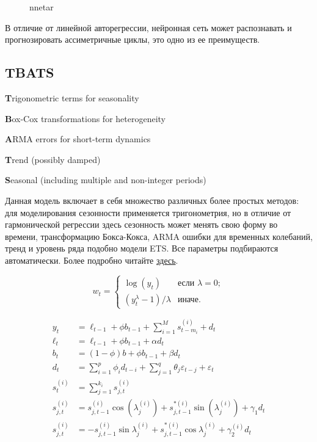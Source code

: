 \documentclass[a4paper,12pt]{article}
\theoremstyle{plain} %
\theoremstyle{definition} %
\theoremstyle{remark} %
\begin{document}
\begin{figure}[H]
  \noindent{}
  \caption{nnetar}
  \label{figCurves}
\end{figure}

В отличие от линейной авторегрессии, нейронная сеть может распознавать и прогнозировать ассиметричные циклы, это одно из ее преимуществ.

\newpage

\subsection{TBATS}

\textbf{T}rigonometric terms for seasonality

\noindent\textbf{B}ox-Cox transformations for heterogeneity

\noindent\textbf{A}RMA errors for short-term dynamics

\noindent\textbf{T}rend (possibly damped)

\noindent\textbf{S}easonal (including multiple and non-integer periods)

\vspace{2ex}

Данная модель включает в себя множество различных более простых методов:
для моделирования сезонности применяется тригонометрия, но в отличие от гармонической регрессии здесь сезонность может менять свою форму во времени, трансформацию Бокса-Кокса, ARMA ошибки для временных колебаний, тренд и уровень ряда подобно модели ETS.
Все параметры подбираются автоматически.
Более подробно читайте \href{https://robjhyndman.com/papers/ComplexSeasonality.pdf}{здесь}.

\[
w_t  =
    \begin{cases}
      \log(y_t) & \text{если $\lambda=0$};  \\
      (y_t^\lambda-1)/\lambda & \text{иначе}.
    \end{cases}
\]

\begin{align*}
  y_t &=\ell_{t-1}+\phi b_{t-1}+\sum_{i=1}^{M} s^{(i)}_{t-m_i} + d_t\\
  \ell_t&=\ell_{t-1}+\phi b_{t-1}+\alpha d_t\\
  b_t &=(1-\phi)b+\phi b_{t-1} + \beta d_t\\
  d_t &= \sum_{i=1}^{p} \phi_{i} d_{t-i} + \sum_{j=1}^{q} \theta_{j} \varepsilon_{t-j} + \varepsilon_t\\
  s_{t}^{(i)} &= \sum_{j=1}^{k_i} s_{j,t}^{(i)}\\
s_{j,t}^{(i)} &= s_{j,t-1}^{(i)}\cos \left(\lambda_j^{(i)} \right) +s_{j,t-1}^{\ast(i)} \sin \left(\lambda_j^{(i)}\right) + \gamma_1d_t \\
s_{j,t}^{(i)} &= - s_{j,t-1}^{(i)}\sin \lambda_j^{(i)}  +s_{j,t-1}^{\ast(i)} \cos \lambda_j^{(i)} + \gamma_{2}^{(i)} d_t
\end{align*}
\end{document}

